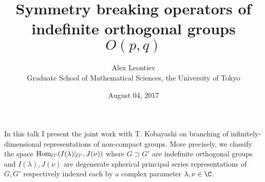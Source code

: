 \documentclass[8pt]{article} %
\title{Symmetry breaking operators of indefinite orthogonal groups $O(p,q)$}
\author{Alex Leontiev\\Graduate School of Mathematical Sciences, the University of Tokyo}
\date{August 04, 2017}
\newcommand{\Hom}{\mbox{\normalfont Hom}}
\theoremstyle{definition}
\begin{document}
\maketitle
In this talk I present the joint work with T. Kobayashi
on branching of infinitely-dimensional representations of non-compact groups. 
More precisely, we classify the space $\Hom_{G'}(I(\lambda)\kern-0.1cm\mid_{G'},J(\nu))$ where $G\supset G'$ are indefinite orthogonal groups and $I(\lambda),J(\nu)$ are
degenerate spherical principal series representations of $G,G'$ respectively indexed each by a complex parameter $\lambda,\nu\in\C$.
\end{document}
